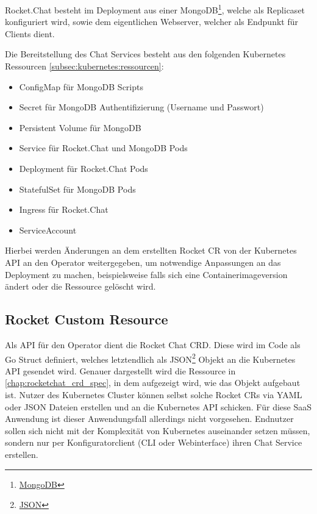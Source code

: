 Rocket.Chat besteht im Deployment aus einer MongoDB\footnote{\href{https://www.mongodb.com/}{MongoDB}}, welche als Replicaset konfiguriert wird,
sowie dem eigentlichen Webserver, welcher als Endpunkt für Clients dient.

Die Bereitstellung des Chat Services besteht aus den folgenden Kubernetes Ressourcen \ref{subsec:kubernetes:ressourcen}:
\begin{itemize}
  \item ConfigMap für MongoDB Scripts
  \item Secret für MongoDB Authentifizierung (Username und Passwort)
  \item Persistent Volume für MongoDB
  \item Service für Rocket.Chat und MongoDB Pods
  \item Deployment für Rocket.Chat Pods
  \item StatefulSet für MongoDB Pods
  \item Ingress für Rocket.Chat
  \item ServiceAccount
\end{itemize} 

Hierbei werden Änderungen an dem erstellten Rocket \ac{CR} von der Kubernetes API an den Operator weitergegeben, um
notwendige Anpassungen an das Deployment zu machen, beispielsweise falls sich eine Containerimageversion ändert 
oder die Ressource gelöscht wird. 

\subsection{Rocket Custom Resource}
Als API für den Operator dient die Rocket Chat \ac{CRD}. Diese wird im Code als Go Struct definiert, welches letztendlich
als JSON\footnote{\href{https://www.json.org/json-de.html}{JSON}} Objekt an die Kubernetes API gesendet wird.
Genauer dargestellt wird die Ressource in \ref{chap:rocketchat_crd_spec}, in dem aufgezeigt wird, wie das Objekt aufgebaut ist.
Nutzer des Kubernetes Cluster können selbst solche Rocket \acp{CR} via YAML oder JSON Dateien erstellen und
an die Kubernetes API schicken. Für diese \ac{SaaS} Anwendung ist dieser Anwendungsfall allerdings nicht vorgesehen.
Endnutzer sollen sich nicht mit der Komplexität von Kubernetes auseinander setzen müssen, 
sondern nur per Konfiguratorclient (\ac{CLI} oder Webinterface) ihren Chat Service erstellen.


